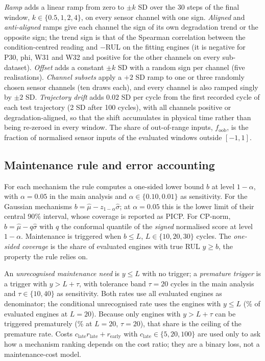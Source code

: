 \emph{Ramp} adds a linear ramp from zero to $\pm k$ SD over the 30 steps of the final window, $k\in\{0.5,1,2,4\}$, on every sensor channel with one sign. \emph{Aligned} and \emph{anti-aligned} ramps give each channel the sign of its own degradation trend or the opposite sign; the trend sign is that of the Spearman correlation between the condition-centred reading and $-$RUL on the fitting engines (it is negative for P30, phi, W31 and W32 and positive for the other channels on every sub-dataset). \emph{Offset} adds a constant $\pm k$ SD with a random sign per channel (five realisations). \emph{Channel subsets} apply a $+2$ SD ramp to one or three randomly chosen sensor channels (ten draws each), and every channel is also ramped singly by $\pm2$ SD. \emph{Trajectory drift} adds $0.02$ SD per cycle from the first recorded cycle of each test trajectory (2 SD after 100 cycles), with all channels positive or degradation-aligned, so that the shift accumulates in physical time rather than being re-zeroed in every window. The share of out-of-range inputs, $f_{\mathrm{oob}}$, is the fraction of normalised sensor inputs of the evaluated windows outside $[-1,1]$.

\subsection{Maintenance rule and error accounting}
For each mechanism the rule computes a one-sided lower bound $b$ at level $1-\alpha$, with $\alpha=0.05$ in the main analysis and $\alpha\in\{0.10,0.01\}$ as sensitivity. For the Gaussian mechanisms $b=\hat\mu-z_{1-\alpha}\hat\sigma$; at $\alpha=0.05$ this is the lower limit of their central 90\% interval, whose coverage is reported as PICP. For CP-norm, $b=\hat\mu-q\hat\sigma$ with $q$ the conformal quantile of the \emph{signed} normalised score at level $1-\alpha$. Maintenance is triggered when $b\le L$, $L\in\{10,20,30\}$ cycles. The \emph{one-sided coverage} is the share of evaluated engines with true RUL $y\ge b$, the property the rule relies on.

An \emph{unrecognised maintenance need} is $y\le L$ with no trigger; a \emph{premature trigger} is a trigger with $y>L+\tau$, with tolerance band $\tau=20$ cycles in the main analysis and $\tau\in\{10,40\}$ as sensitivity. Both rates use all evaluated engines as denominator; the conditional unrecognised rate uses the engines with $y\le L$ (\RVAtRisk\% of evaluated engines at $L=20$). Because only engines with $y>L+\tau$ can be triggered prematurely (\RVFar\% at $L=20$, $\tau=20$), that share is the ceiling of the premature rate. Costs $c_{\mathrm{late}}r_{\mathrm{late}}+r_{\mathrm{early}}$ with $c_{\mathrm{late}}\in\{5,20,100\}$ are used only to ask how a mechanism ranking depends on the cost ratio; they are a binary loss, not a maintenance-cost model.


